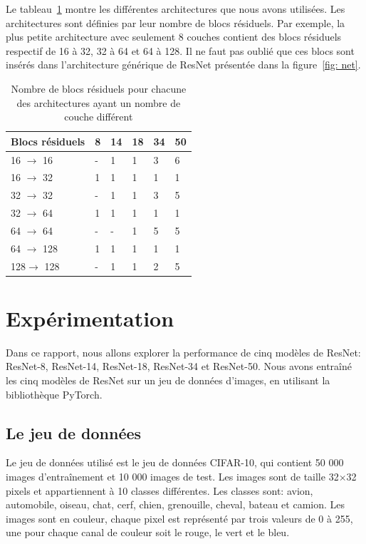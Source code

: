 \documentclass{article}
\begin{document}
Le tableau~\ref{tab:resnet} montre les différentes architectures que nous avons utilisées. Les architectures sont
définies par leur nombre de blocs résiduels. Par exemple, la plus petite architecture avec seulement 8 couches contient
des blocs résiduels respectif de 16 à 32, 32 à 64 et 64 à 128. Il ne faut pas oublié que ces blocs sont insérés dans l'architecture
générique de ResNet présentée dans la figure~\ref{fig: net}.

\begin{table}[H]
\centering
\begin{tabular}{llllll}
\hline
Blocs résiduels & 8 & 14 & 18 & 34 & 50 \\
\hline
16 $\rightarrow $ 16 & - & 1 & 1 & 3 & 6 \\
16 $\rightarrow $ 32 & 1 & 1 & 1 & 1 & 1 \\
32 $\rightarrow $ 32 & - & 1 & 1 & 3 & 5 \\
32 $\rightarrow $ 64 & 1 & 1 & 1 & 1 & 1 \\
64 $\rightarrow $ 64 & - & - & 1 & 5 & 5 \\
64 $\rightarrow $ 128 & 1 & 1 & 1 & 1 & 1 \\
128$\rightarrow $ 128 & - & 1 & 1 & 2 & 5 \\
\hline
\end{tabular}
\caption{Nombre de blocs résiduels pour chacune des architectures ayant un nombre de couche différent}\label{tab:resnet}
\end{table}

\section{Expérimentation}

Dans ce rapport, nous allons explorer la performance de cinq modèles de ResNet: ResNet-8, ResNet-14, ResNet-18, ResNet-34 et ResNet-50.
Nous avons entraîné les cinq modèles de ResNet sur un jeu de données d'images, en utilisant la bibliothèque PyTorch.

\subsection{Le jeu de données}

Le jeu de données utilisé est le jeu de données CIFAR-10, qui contient 50 000 images d'entraînement et 10 000 images
de test. Les images sont de taille 32$\times$32 pixels et appartiennent à 10 classes différentes. Les classes sont:
avion, automobile, oiseau, chat, cerf, chien, grenouille, cheval, bateau et camion. Les images sont en couleur,
chaque pixel est représenté par trois valeurs de 0 à 255, une pour chaque canal de couleur soit le rouge, le vert et le bleu.
\end{document}
